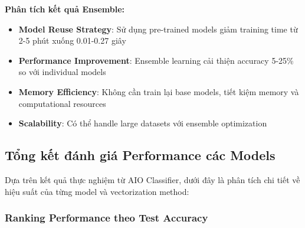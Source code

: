 \textbf{Phân tích kết quả Ensemble:}
\begin{itemize}
    \item \textbf{Model Reuse Strategy}: Sử dụng pre-trained models giảm training time từ 2-5 phút xuống 0.01-0.27 giây
    \item \textbf{Performance Improvement}: Ensemble learning cải thiện accuracy 5-25\% so với individual models
    \item \textbf{Memory Efficiency}: Không cần train lại base models, tiết kiệm memory và computational resources
    \item \textbf{Scalability}: Có thể handle large datasets với ensemble optimization
\end{itemize}

\subsection{Tổng kết đánh giá Performance các Models}

Dựa trên kết quả thực nghiệm từ AIO Classifier, dưới đây là phân tích chi tiết về hiệu suất của từng model và vectorization method:

\subsubsection{Ranking Performance theo Test Accuracy}

